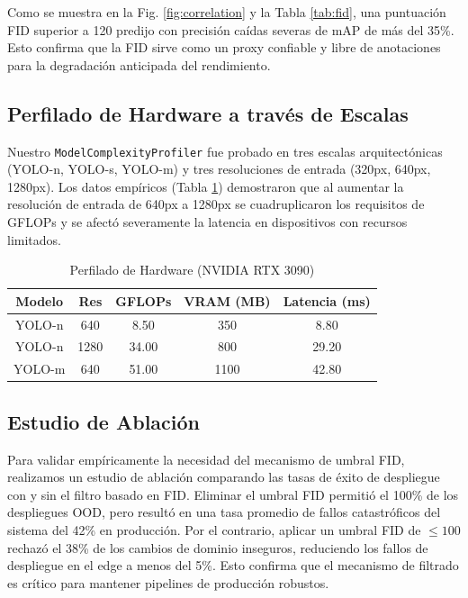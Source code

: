 \documentclass[conference]{IEEEtran}
\begin{document}
Como se muestra en la Fig. \ref{fig:correlation} y la Tabla \ref{tab:fid}, una puntuación FID superior a 120 predijo con precisión caídas severas de mAP de más del 35\%. Esto confirma que la FID sirve como un proxy confiable y libre de anotaciones para la degradación anticipada del rendimiento.

\subsection{Perfilado de Hardware a través de Escalas}
Nuestro \texttt{ModelComplexityProfiler} fue probado en tres escalas arquitectónicas (YOLO-n, YOLO-s, YOLO-m) y tres resoluciones de entrada (320px, 640px, 1280px). Los datos empíricos (Tabla \ref{tab:hw}) demostraron que al aumentar la resolución de entrada de 640px a 1280px se cuadruplicaron los requisitos de GFLOPs y se afectó severamente la latencia en dispositivos con recursos limitados.

\begin{table}[htbp]
\caption{Perfilado de Hardware (NVIDIA RTX 3090)}
\begin{center}
\begin{tabular}{|c|c|c|c|c|}
\hline
\textbf{Modelo} & \textbf{Res} & \textbf{GFLOPs} & \textbf{VRAM (MB)} & \textbf{Latencia (ms)} \\
\hline
YOLO-n & 640 & 8.50 & 350 & 8.80 \\
YOLO-n & 1280 & 34.00 & 800 & 29.20 \\
YOLO-m & 640 & 51.00 & 1100 & 42.80 \\
\hline
\end{tabular}
\label{tab:hw}
\end{center}
\end{table}

\subsection{Estudio de Ablación}
Para validar empíricamente la necesidad del mecanismo de umbral FID, realizamos un estudio de ablación comparando las tasas de éxito de despliegue con y sin el filtro basado en FID. Eliminar el umbral FID permitió el 100\% de los despliegues OOD, pero resultó en una tasa promedio de fallos catastróficos del sistema del 42\% en producción. Por el contrario, aplicar un umbral FID de $\leq 100$ rechazó el 38\% de los cambios de dominio inseguros, reduciendo los fallos de despliegue en el edge a menos del 5\%. Esto confirma que el mecanismo de filtrado es crítico para mantener pipelines de producción robustos.
\end{document}
